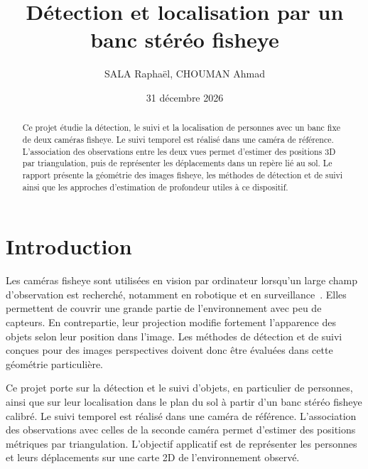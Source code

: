 \documentclass[11pt,a4paper]{article}
\title{\textbf{Détection et localisation par un banc stéréo fisheye}}
\author{SALA Raphaël, CHOUMAN Ahmad }
\date{31 décembre 2026}
\begin{document}
\maketitle


\begin{abstract}




Ce projet étudie la détection, le suivi et la localisation de personnes avec un banc fixe de deux caméras fisheye. Le suivi temporel est réalisé dans une caméra de référence. L'association des observations entre les deux vues permet d'estimer des positions 3D par triangulation, puis de représenter les déplacements dans un repère lié au sol. Le rapport présente la géométrie des images fisheye, les méthodes de détection et de suivi ainsi que les approches d'estimation de profondeur utiles à ce dispositif.


\end{abstract}




\section{Introduction}



Les caméras fisheye sont utilisées en vision par ordinateur lorsqu'un large champ d'observation est recherché, notamment en robotique et en surveillance~\cite{schneider2009,yogamani2019}. Elles permettent de couvrir une grande partie de l'environnement avec peu de capteurs. En contrepartie, leur projection modifie fortement l'apparence des objets selon leur position dans l'image. Les méthodes de détection et de suivi conçues pour des images perspectives doivent donc être évaluées dans cette géométrie particulière.

Ce projet porte sur la détection et le suivi d'objets, en particulier de personnes, ainsi que sur leur localisation dans le plan du sol à partir d'un banc stéréo fisheye calibré. Le suivi temporel est réalisé dans une caméra de référence. L'association des observations avec celles de la seconde caméra permet d'estimer des positions métriques par triangulation. L'objectif applicatif est de représenter les personnes et leurs déplacements sur une carte 2D de l'environnement observé.
\end{document}
